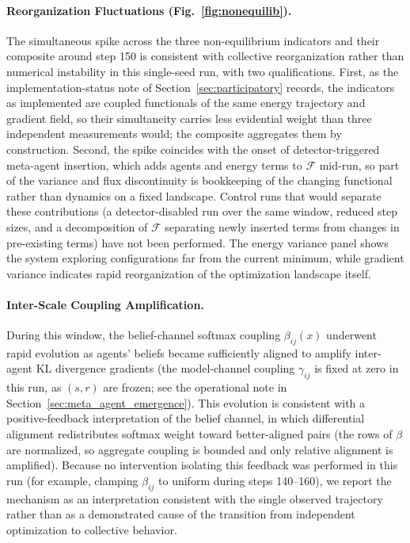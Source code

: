 \documentclass[11pt]{article}
\begin{document}
\paragraph{Reorganization Fluctuations (Fig.~\ref{fig:nonequilib}).}
The simultaneous spike across the three non-equilibrium indicators and their composite around step 150 is consistent with collective reorganization rather than numerical instability in this single-seed run, with two qualifications. First, as the implementation-status note of Section~\ref{sec:participatory} records, the indicators as implemented are coupled functionals of the same energy trajectory and gradient field, so their simultaneity carries less evidential weight than three independent measurements would; the composite aggregates them by construction. Second, the spike coincides with the onset of detector-triggered meta-agent insertion, which adds agents and energy terms to $\mathcal{F}$ mid-run, so part of the variance and flux discontinuity is bookkeeping of the changing functional rather than dynamics on a fixed landscape. Control runs that would separate these contributions (a detector-disabled run over the same window, reduced step sizes, and a decomposition of $\mathcal{F}$ separating newly inserted terms from changes in pre-existing terms) have not been performed. The energy variance panel shows the system exploring configurations far from the current minimum, while gradient variance indicates rapid reorganization of the optimization landscape itself.

\paragraph{Inter-Scale Coupling Amplification.}
During this window, the belief-channel softmax coupling $\beta_{ij}(x)$ underwent rapid evolution as agents' beliefs became sufficiently aligned to amplify inter-agent KL divergence gradients (the model-channel coupling $\gamma_{ij}$ is fixed at zero in this run, as $(s,r)$ are frozen; see the operational note in Section~\ref{sec:meta_agent_emergence}). This evolution is consistent with a positive-feedback interpretation of the belief channel, in which differential alignment redistributes softmax weight toward better-aligned pairs (the rows of $\beta$ are normalized, so aggregate coupling is bounded and only relative alignment is amplified). Because no intervention isolating this feedback was performed in this run (for example, clamping $\beta_{ij}$ to uniform during steps 140--160), we report the mechanism as an interpretation consistent with the single observed trajectory rather than as a demonstrated cause of the transition from independent optimization to collective behavior.
\end{document}
